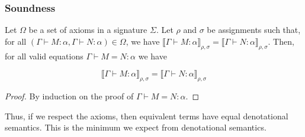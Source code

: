 \documentclass[aspectratio=169]{beamer}
\begin{document}
\begin{frame}
\frametitle{Soundness}

\begin{theorem}
    Let $\Omega$ be a set of axioms in a signature $\Sigma$.
    Let $\rho$ and $\sigma$ be assignments such that, for all $\left(\Gamma \vdash M : \alpha, \Gamma \vdash N : \alpha\right) \in \Omega$, we have $\llbracket \Gamma \vdash M : \alpha \rrbracket_{\rho, \sigma} = \llbracket \Gamma \vdash N : \alpha \rrbracket_{\rho, \sigma}$.
    Then, for all valid equations $\Gamma \vdash M = N : \alpha$ we have
    
    \[
        \llbracket \Gamma \vdash M : \alpha \rrbracket_{\rho, \sigma} = \llbracket \Gamma \vdash N : \alpha \rrbracket_{\rho, \sigma}
    \]
    \begin{proof}
        By induction on the proof of $\Gamma \vdash M = N : \alpha$.
    \end{proof}
\end{theorem}

\medskip

Thus, if we respect the axioms, then equivalent terms have equal denotational semantics. This is the minimum we expect from denotational semantics.

\end{frame}
\end{document}
